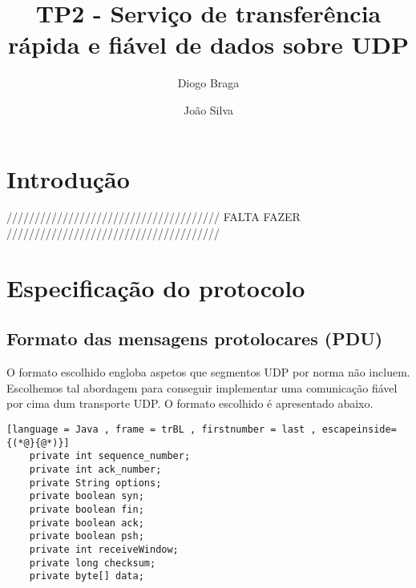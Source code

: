 \documentclass{llncs}
\begin{document}
\mainmatter
\title{TP2 - Serviço de transferência rápida e fiável de dados sobre UDP}


\author{Diogo Braga \and João Silva}



\date{}


\maketitle

\section{Introdução}

////////////////////////////////////// FALTA FAZER //////////////////////////////////////



\section{Especificação do protocolo}




\subsection{Formato das mensagens protolocares (PDU)}

O formato escolhido engloba aspetos que segmentos UDP por norma não incluem. Escolhemos tal abordagem para conseguir implementar uma comunicação fiável por cima dum transporte UDP. O formato escolhido é apresentado abaixo.

\begin{lstlisting}[language = Java , frame = trBL , firstnumber = last , escapeinside={(*@}{@*)}]
	private int sequence_number;
	private int ack_number;
	private String options;
	private boolean syn;
	private boolean fin;
	private boolean ack;
	private boolean psh;
	private int receiveWindow;
	private long checksum;
	private byte[] data;
\end{lstlisting}
\end{document}
